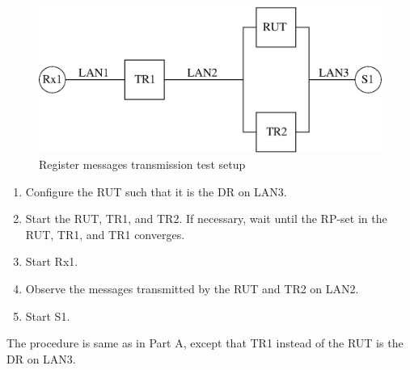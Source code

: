 \documentclass[11pt]{report}
\begin{document}
\begin{figure}[htbp]
  \begin{center}
    \includegraphics[scale=0.8]{figs/pim_test_3_1_register_messages_transmission}
    \caption{Register messages transmission test setup}
    \label{fig:register_messages_transmission}
  \end{center}
\end{figure}



\begin{enumerate}

  \item Configure the RUT such that it is the DR on LAN3.

  \item Start the RUT, TR1, and TR2. If necessary, wait until the RP-set in
        the RUT, TR1, and TR1 converges.

  \item Start Rx1.

  \item Observe the messages transmitted by the RUT and TR2 on LAN2.

  \item Start S1.

\end{enumerate}


The procedure is same as in Part A, except that TR1 instead of the RUT is the
DR on LAN3.

\end{document}
